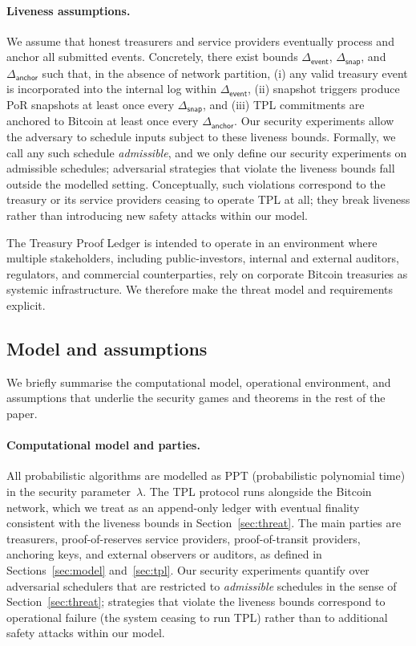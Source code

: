 \documentclass[11pt]{article}
\begin{document}
\paragraph{Liveness assumptions.}
We assume that honest treasurers and service providers eventually process and anchor all
submitted events.
Concretely, there exist bounds $\Delta_{\mathsf{event}}$, $\Delta_{\mathsf{snap}}$, and
$\Delta_{\mathsf{anchor}}$ such that, in the absence of network partition,
(i) any valid treasury event is incorporated into the internal log within $\Delta_{\mathsf{event}}$,
(ii) snapshot triggers produce PoR snapshots at least once every $\Delta_{\mathsf{snap}}$, and
(iii) TPL commitments are anchored to Bitcoin at least once every $\Delta_{\mathsf{anchor}}$.
Our security experiments allow the adversary to schedule inputs subject to these liveness bounds.
Formally, we call any such schedule \emph{admissible}, and we only define our security experiments on admissible
schedules; adversarial strategies that violate the liveness bounds fall outside the modelled setting.
Conceptually, such violations correspond to the treasury or its service providers ceasing to operate TPL at all;
they break liveness rather than introducing new safety attacks within our model.

The Treasury Proof Ledger is intended to operate in an environment where multiple stakeholders, including public-investors, internal and external auditors, regulators, and commercial counterparties, rely on corporate Bitcoin treasuries as systemic infrastructure.
We therefore make the threat model and requirements explicit.

\subsection{Model and assumptions}
\label{sec:model-assumptions}

We briefly summarise the computational model, operational environment, and assumptions that underlie the security games
and theorems in the rest of the paper.

\paragraph{Computational model and parties.}
All probabilistic algorithms are modelled as PPT (probabilistic polynomial time) in the security parameter~$\lambda$.
The TPL protocol runs alongside the Bitcoin network, which we treat as an append-only ledger with eventual
finality consistent with the liveness bounds in Section~\ref{sec:threat}.
The main parties are treasurers, proof-of-reserves service providers, proof-of-transit providers, anchoring keys,
and external observers or auditors, as defined in Sections~\ref{sec:model} and~\ref{sec:tpl}.
Our security experiments quantify over adversarial schedulers that are restricted to \emph{admissible} schedules in the sense of Section~\ref{sec:threat};
strategies that violate the liveness bounds correspond to operational failure (the system ceasing to run TPL) rather than to additional safety attacks within our model.
\end{document}
